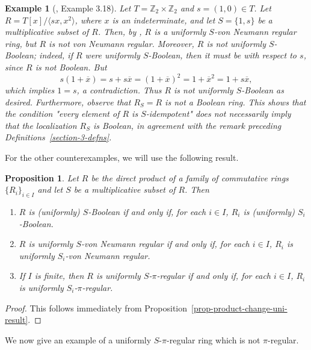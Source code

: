 \documentclass[12pt]{article}
\newtheorem{prop}[thm]{\bf Proposition}
\newtheorem{exmp}[thm]{\bf Example}
\begin{document}
\begin{exmp}[\cite{Zha4}, Example 3.18]\label{exmp-u-s-von-neum-not-u-s-bool}
Let \( T = \mathbb{Z}_2 \times \mathbb{Z}_2 \) and \( s = (1, 0) \in T \).  
Let \( R = T[x]/\langle sx, x^2 \rangle \), where \( x \) is an indeterminate, and let \( S = \{1, s\} \) be a multiplicative subset of \( R \).  
Then, by \cite[Example 3.18]{Zha4}, \( R \) is a uniformly \( S \)-von Neumann regular ring, but \( R \) is not von Neumann regular.  
Moreover, \( R \) is not uniformly \( S \)-Boolean; indeed, if \( R \) were uniformly \( S \)-Boolean, then it must be with respect to \( s \), since \( R \) is not Boolean.  
But
\[
s(1+\overline{x}) = s+s\overline{x} = (1+\overline{x})^2 = 1+\overline{x}^2 = 1+s\overline{x},
\]
which implies \( 1=s \), a contradiction.  
Thus \( R \) is not uniformly \( S \)-Boolean as desired. Furthermore, observe that \(R_S = R\) is not a Boolean ring. This shows that the condition "every element of \(R\) is \(S\)-idempotent" does not necessarily imply that the localization \(R_S\) is Boolean, in agreement with the remark preceding Definitions~\ref{section-3-defns}.
\end{exmp}

For the other counterexamples, we will use the following result.

\begin{prop}\label{prop-product-change-result-for-rings} 
Let \( R \) be the direct product of a family of commutative rings \( \{R_i\}_{i\in I} \) and let \( S \) be a multiplicative subset of \( R \).  
Then 
\begin{enumerate}
\item \( R \) is (uniformly) \( S \)-Boolean if and only if, for each \( i\in I \), \( R_i \) is (uniformly) \( S_i \)-Boolean. 
\item \( R \) is uniformly \( S \)-von Neumann regular if and only if, for each \( i\in I \), \( R_i \) is uniformly \( S_i \)-von Neumann regular. 
\item If \( I \) is finite, then \( R \) is uniformly \( S \)-\( \pi \)-regular if and only if, for each \( i\in I \), \( R_i \) is uniformly \( S_i \)-\( \pi \)-regular.
\end{enumerate}
\end{prop}

\begin{proof}
This follows immediately from Proposition~\ref{prop-product-change-uni-result}.
\end{proof}

We now give an example of a uniformly \( S \)-\( \pi \)-regular ring which is not \( \pi \)-regular.
\end{document}
